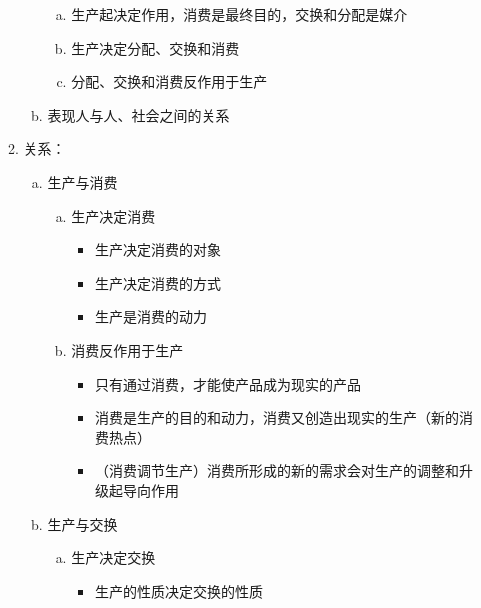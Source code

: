 \documentclass[12pt]{book}
\begin{document}
\begin{enumerate}[1.]
\begin{enumerate}[(1)]
\begin{enumerate}[a.]
\begin{enumerate}[(a)]
                            \item 生产起决定作用，消费是最终目的，交换和分配是媒介
                            \item 生产决定分配、交换和消费
                            \item 分配、交换和消费反作用于生产
                          \end{enumerate}
                    \item 表现人与人、社会之间的关系
                  \end{enumerate}
            \item 关系：
                  \begin{enumerate}[a.]
                    \item 生产与消费
                          \begin{enumerate}[(a)]
                            \item 生产决定消费
                                  \begin{itemize}
                                    \item 生产决定消费的对象
                                    \item 生产决定消费的方式
                                    \item 生产是消费的动力
                                  \end{itemize}
                            \item 消费反作用于生产
                                  \begin{itemize}
                                    \item 只有通过消费，才能使产品成为现实的产品
                                    \item 消费是生产的目的和动力，消费又创造出现实的生产（新的消费热点）
                                    \item （消费调节生产）消费所形成的新的需求会对生产的调整和升级起导向作用
                                  \end{itemize}
                          \end{enumerate}
                    \item 生产与交换
                          \begin{enumerate}[(a)]
                            \item 生产决定交换
                                  \begin{itemize}
                                    \item 生产的性质决定交换的性质

\end{itemize}
\end{enumerate}
\end{enumerate}
\end{enumerate}
\end{enumerate}
\end{document}
